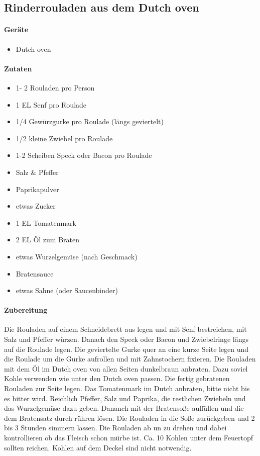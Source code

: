 \subsection{Rinderrouladen aus dem Dutch oven}

\paragraph{Geräte}

\begin{itemize}[noitemsep]
	\item Dutch oven
\end{itemize}

\paragraph{Zutaten}

\begin{itemize}[noitemsep]
	\item 1- 2 Rouladen pro Person
	\item 1 EL Senf pro Roulade
	\item 1/4 Gewürzgurke pro Roulade (längs geviertelt)
	\item 1/2 kleine Zwiebel pro Roulade
	\item 1-2 Scheiben Speck oder Bacon pro Roulade
	\item Salz \& Pfeffer
	\item Paprikapulver
	\item etwas Zucker
	\item 1 EL Tomatenmark
	\item 2 EL Öl zum Braten
	\item etwas Wurzelgemüse (nach Geschmack)
	\item Bratensauce
	\item etwas Sahne (oder Saucenbinder)
\end{itemize}

\paragraph{Zubereitung}

Die Rouladen auf einem Schneidebrett aus legen und mit Senf bestreichen, 
mit Salz und Pfeffer würzen. Danach den Speck oder Bacon und 
Zwiebelringe längs auf die Roulade legen. Die geviertelte Gurke quer an 
eine kurze Seite legen und die Roulade um die Gurke aufrollen und mit 
Zahnstochern fixieren.
Die Rouladen mit dem Öl im Dutch oven von allen Seiten dunkelbraun 
anbraten. Dazu soviel Kohle verwenden wie unter den Dutch oven passen. 
Die fertig gebratenen Rouladen zur Seite legen. 
Das Tomatenmark im Dutch anbraten, bitte nicht bis es bitter wird. 
Reichlich Pfeffer, Salz und Paprika, die restlichen Zwiebeln und das 
Wurzelgemüse dazu geben. Dananch mit der Bratensoße auffüllen und die 
dem Bratensatz durch rühren lösen. Die Rouladen in die Soße zurückgeben 
und 2 bis 3 Stunden simmern lassen. Die Rouladen ab un zu drehen und 
dabei kontrollieren ob das Fleisch schon mürbe ist. Ca. 10 Kohlen unter 
dem Feuertopf sollten reichen. Kohlen auf dem Deckel sind nicht 
notwendig.
\newpage

